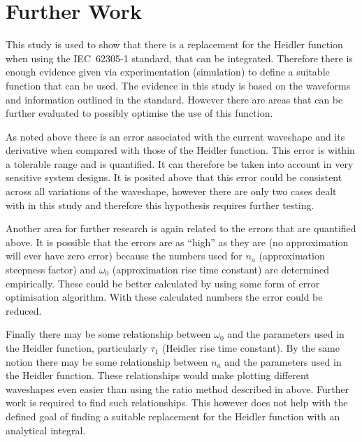 
\section{Further Work}
\label{sec:discussion_further_work}
This study is used to show that there is a replacement for the Heidler function when using the IEC~62305-1 standard, that can be integrated. Therefore there is enough evidence given via experimentation (simulation) to define a suitable function that can be used. The evidence in this study is based on the waveforms and information outlined in the standard. However there are areas that can be further evaluated to possibly optimise the use of this function.

As noted above there is an error associated with the current waveshape and its derivative when compared with those of the Heidler function. This error is within a tolerable range and is quantified. It can therefore be taken into account in very sensitive system designs. It is posited above that this error could be consistent across all variations of the waveshape, however there are only two cases dealt with in this study and therefore this hypothesis requires further testing.

Another area for further research is again related to the errors that are quantified above. It is possible that the errors are as ``high'' as they are (no approximation will ever have zero error) because the numbers used for $n_a$ (approximation steepness factor) and $\omega_0$ (approximation rise time constant) are determined empirically. These could be better calculated by using some form of error optimisation algorithm. With these calculated numbers the error could be reduced.

Finally there may be some relationship between $\omega_0$ and the parameters used in the Heidler function, particularly $\tau_1$ (Heidler rise time constant). By the same notion there may be some relationship between $n_a$ and the parameters used in the Heidler function. These relationships would make plotting different waveshapes even easier than using the ratio method described in  above. Further work is required to find such relationships. This however does not help with the defined goal of finding a suitable replacement for the Heidler function with an analytical integral.


